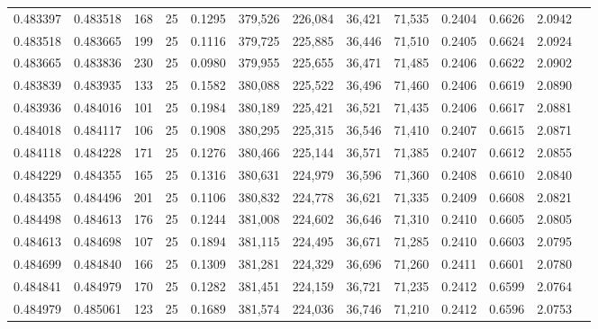 \begin{tabular}{rrrrrrrrrrrrr}
0.483397 & 0.483518 &   168 &  25 &                                     0.1295 & 379,526 & 226,084 &  36,421 &  71,535 & 0.2404 & 0.6626 & 2.0942 \\
0.483518 & 0.483665 &   199 &  25 &                                     0.1116 & 379,725 & 225,885 &  36,446 &  71,510 & 0.2405 & 0.6624 & 2.0924 \\
0.483665 & 0.483836 &   230 &  25 &                                     0.0980 & 379,955 & 225,655 &  36,471 &  71,485 & 0.2406 & 0.6622 & 2.0902 \\
0.483839 & 0.483935 &   133 &  25 &                                     0.1582 & 380,088 & 225,522 &  36,496 &  71,460 & 0.2406 & 0.6619 & 2.0890 \\
0.483936 & 0.484016 &   101 &  25 &                                     0.1984 & 380,189 & 225,421 &  36,521 &  71,435 & 0.2406 & 0.6617 & 2.0881 \\
0.484018 & 0.484117 &   106 &  25 &                                     0.1908 & 380,295 & 225,315 &  36,546 &  71,410 & 0.2407 & 0.6615 & 2.0871 \\
0.484118 & 0.484228 &   171 &  25 &                                     0.1276 & 380,466 & 225,144 &  36,571 &  71,385 & 0.2407 & 0.6612 & 2.0855 \\
0.484229 & 0.484355 &   165 &  25 &                                     0.1316 & 380,631 & 224,979 &  36,596 &  71,360 & 0.2408 & 0.6610 & 2.0840 \\
0.484355 & 0.484496 &   201 &  25 &                                     0.1106 & 380,832 & 224,778 &  36,621 &  71,335 & 0.2409 & 0.6608 & 2.0821 \\
0.484498 & 0.484613 &   176 &  25 &                                     0.1244 & 381,008 & 224,602 &  36,646 &  71,310 & 0.2410 & 0.6605 & 2.0805 \\
0.484613 & 0.484698 &   107 &  25 &                                     0.1894 & 381,115 & 224,495 &  36,671 &  71,285 & 0.2410 & 0.6603 & 2.0795 \\
0.484699 & 0.484840 &   166 &  25 &                                     0.1309 & 381,281 & 224,329 &  36,696 &  71,260 & 0.2411 & 0.6601 & 2.0780 \\
0.484841 & 0.484979 &   170 &  25 &                                     0.1282 & 381,451 & 224,159 &  36,721 &  71,235 & 0.2412 & 0.6599 & 2.0764 \\
0.484979 & 0.485061 &   123 &  25 &                                     0.1689 & 381,574 & 224,036 &  36,746 &  71,210 & 0.2412 & 0.6596 & 2.0753 \\

\end{tabular}
